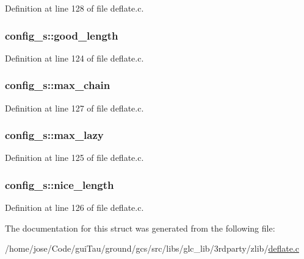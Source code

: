 Definition at line 128 of file deflate.\-c.

\hypertarget{structconfig__s_a36152319fbe49bebbc0354f8bcb617a6}{
\subsubsection[{good\-\_\-length}]{ config\-\_\-s\-::good\-\_\-length}}\label{structconfig__s_a36152319fbe49bebbc0354f8bcb617a6}


Definition at line 124 of file deflate.\-c.

\hypertarget{structconfig__s_ac0ef64600cf4487e3754a21934ffdb89}{
\subsubsection[{max\-\_\-chain}]{ config\-\_\-s\-::max\-\_\-chain}}\label{structconfig__s_ac0ef64600cf4487e3754a21934ffdb89}


Definition at line 127 of file deflate.\-c.

\hypertarget{structconfig__s_afecf50eeeb2afca11ab28d344280231b}{
\subsubsection[{max\-\_\-lazy}]{ config\-\_\-s\-::max\-\_\-lazy}}\label{structconfig__s_afecf50eeeb2afca11ab28d344280231b}


Definition at line 125 of file deflate.\-c.

\hypertarget{structconfig__s_af2a1e023e10d6e0c9ff64f8c0c4c9894}{
\subsubsection[{nice\-\_\-length}]{ config\-\_\-s\-::nice\-\_\-length}}\label{structconfig__s_af2a1e023e10d6e0c9ff64f8c0c4c9894}


Definition at line 126 of file deflate.\-c.



The documentation for this struct was generated from the following file\-:\begin{DoxyCompactItemize}
\item 
/home/jose/\-Code/gui\-Tau/ground/gcs/src/libs/glc\-\_\-lib/3rdparty/zlib/\hyperlink{deflate_8c}{deflate.\-c}\end{DoxyCompactItemize}
